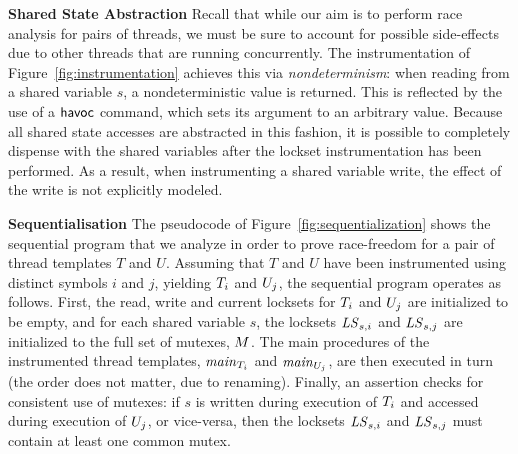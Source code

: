 \noindent\textbf{Shared State Abstraction }
%
Recall that while our aim is to perform race analysis for pairs of threads, we must be sure to account for possible side-effects due to other threads that are running concurrently.  The instrumentation of Figure~\ref{fig:instrumentation} achieves this via \emph{nondeterminism}: when reading from a shared variable $s$, a nondeterministic value is returned.  This is reflected by the use of a $\mathsf{havoc}$ command, which sets its argument to an arbitrary value.  Because all shared state accesses are abstracted in this fashion, it is possible to completely dispense with the shared variables after the lockset instrumentation has been performed.  As a result, when instrumenting a shared variable write, the effect of the write is not explicitly modeled.

\noindent\textbf{Sequentialisation }
%
The pseudocode of Figure~\ref{fig:sequentialization} shows the sequential program that we analyze in order to prove race-freedom for a pair of thread templates $T$ and $U$. Assuming that $T$ and $U$ have been instrumented using distinct symbols $i$ and $j$, yielding $T_{i}$ and $U_{j}$, the sequential program operates as follows. First, the read, write and current locksets for $T_{i}$ and $U_{j}$ are initialized to be empty, and for each shared variable $s$, the locksets $\mathit{LS}_{s,i}$ and $\mathit{LS}_{s,j}$ are initialized to the full set of mutexes, $M$.  The main procedures of the instrumented thread templates, $\mathit{main}_{T_{i}}$ and $\mathit{main}_{U_{j}}$, are then executed in turn (the order does not matter, due to renaming). Finally, an assertion checks for consistent use of mutexes: if $s$ is written during execution of $T_{i}$ and accessed during execution of $U_{j}$, or vice-versa, then the locksets $\mathit{LS}_{s,i}$ and $\mathit{LS}_{s,j}$ must contain at least one common mutex.

